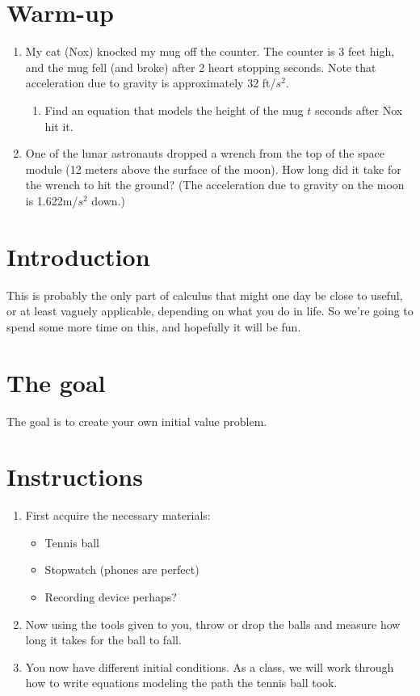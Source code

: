 \documentclass{article}[12pt]
\theoremstyle{definition}
\theoremstyle{example}
\theoremstyle{theorem}
\begin{document}
\section{Warm-up}
\begin{enumerate}
\item My cat (Nox) knocked my mug off the counter. The counter is 3 feet high, and the mug fell (and broke) after 2 heart stopping seconds. Note that acceleration due to gravity is approximately 32 ft/$s^2$.
\begin{enumerate}
\item Find an equation that models the height of the mug $t$ seconds after Nox hit it.
\end{enumerate}
\vspace{4cm}
\item One of the lunar astronauts dropped a wrench from the top of the space module (12 meters above the surface of the moon). How long did it take for the wrench to hit the ground? (The acceleration due to gravity on the moon is 1.622m/$s^2$ down.)
\end{enumerate}
\vspace{4cm}
\section{Introduction}
This is probably the only part of calculus that might one day be close to useful, or at least vaguely applicable,  depending on what you do in life. So we're going to spend some more time on this, and hopefully it will be fun.
\section{The goal}
The goal is to create your own initial value problem. 
\section{Instructions}
\begin{enumerate}
\item First acquire the necessary materials:
\begin{itemize}
\item Tennis ball
\item Stopwatch (phones are perfect)
\item Recording device perhaps?
\end{itemize}
\item Now using the tools given to you, throw or drop the balls and measure how long it takes for the ball to fall. 
\item You now have different initial conditions. 
As a class, we will work through how to write equations modeling the path the tennis ball took. 
\end{enumerate}
\end{document}

